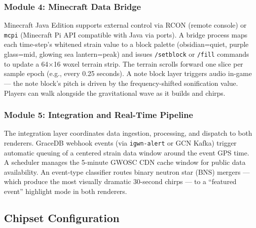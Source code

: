 \documentclass[11pt,letterpaper]{article}
\begin{document}
\subsubsection{Module 4: Minecraft Data Bridge}

Minecraft Java Edition supports external control via RCON (remote console) or \texttt{mcpi} (Minecraft Pi API compatible with Java via ports). A bridge process maps each time-step's whitened strain value to a block palette (obsidian=quiet, purple glass=mid, glowing sea lantern=peak) and issues \texttt{/setblock} or \texttt{/fill} commands to update a 64$\times$16 woxel terrain strip. The terrain scrolls forward one slice per sample epoch (e.g., every 0.25 seconds). A note block layer triggers audio in-game --- the note block's pitch is driven by the frequency-shifted sonification value. Players can walk alongside the gravitational wave as it builds and chirps.

\subsubsection{Module 5: Integration and Real-Time Pipeline}

The integration layer coordinates data ingestion, processing, and dispatch to both renderers. GraceDB webhook events (via \texttt{igwn-alert} or GCN Kafka) trigger automatic queuing of a centered strain data window around the event GPS time. A scheduler manages the 5-minute GWOSC CDN cache window for public data availability. An event-type classifier routes binary neutron star (BNS) mergers --- which produce the most visually dramatic 30-second chirps --- to a ``featured event'' highlight mode in both renderers.

\subsection{Chipset Configuration}
\end{document}
